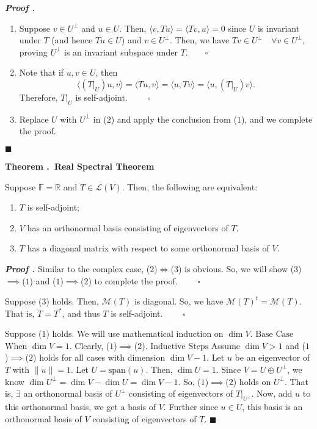\documentclass[11pt, letterpaper]{article}
\newcounter{index}[subsection]
\newenvironment*{thm}[1]{\begin{tcolorbox}\par\noindent\textbf{Theorem \thesubsection.\stepcounter{index}\theindex\ #1} \par}{\par\end{tcolorbox}}
\newcounter{nprf}[subsection]
\newenvironment*{prf}{\par\indent\textbf{\textit{Proof \stepcounter{nprf}\thenprf.}}}{\hfill$\blacksquare$\par}
\def\R{\mathbb{R}}
\def\F{\mathbb{F}}
\def\L{\mathcal{L}}
\def\M{\mathcal{M}}
\def\span{\mathrm{span}}
\def\pqde{\qquad\square}
\begin{document}
\begin{prf}
	\begin{enumerate}
		\item Suppose $v\in U^\perp$ and $u\in U$. Then, $\langle v,Tu\rangle=\langle Tv,u\rangle=0$ since $U$ is invariant under $T$ (and hence $Tu\in U$) and $v\in U^\perp$. Then, we have $Tv\in U^\perp\quad\forall v\in U^\perp$, proving $U^\perp$ is an invariant subspace under $T.\pqde$
		\item Note that if $u,v\in U$, then \[\langle(T|_U)u,v\rangle=\langle Tu,v\rangle=\langle u,Tv\rangle=\langle u,(T|_U)v\rangle.\] Therefore, $T|_U$ is self-adjoint. $\pqde$
		\item Replace $U$ with $U^\perp$ in ($2$) and apply the conclusion from ($1$), and we complete the proof.
	\end{enumerate}
\end{prf}
\begin{thm}{Real Spectral Theorem}
	Suppose $\F=\R$ and $T\in\L(V)$. Then, the following are equivalent: 
	\begin{enumerate}
		\item $T$ is self-adjoint;
		\item $V$ has an orthonormal basis consisting of eigenvectors of $T$.
		\item $T$ has a diagonal matrix with respect to some orthonormal basis of $V$.
	\end{enumerate}
\end{thm}
\begin{prf}
	Similar to the complex case, ($2$)$\iff$($3$) is obvious. So, we will show ($3$)$\implies$($1$) and ($1$)$\implies$($2$) to complete the proof. $\pqde$\par 
	Suppose ($3$) holds. Then, $\M(T)$ is diagonal. So, we have $\M(T)^t=\M(T)$. That is, $T=T^*$, and thus $T$ is self-adjoint. $\pqde$\par 
	Suppose ($1$) holds. We will use mathematical induction on $\dim V$. $\boxed{\text{Base Case}}$ When $\dim V=1$. Clearly, ($1$)$\implies$($2$). $\boxed{\text{Inductive Steps}}$ Assume $\dim V>1$ and ($1$)$\implies$($2$) holds for all cases with dimension $\dim V-1$. Let $u$ be an eigenvector of $T$ with $\|u\|=1$. Let $U=\span(u)$. Then, $\dim U=1$. Since $V=U\oplus U^\perp$, we know $\dim U^\perp=\dim V-\dim U=\dim V-1$. So, ($1$)$\implies$($2$) holds on $U^\perp$. That is, $\exists$ an orthonormal basis of $U^\perp$ consisting of eigenvectors of $T|_{U^\perp}$. Now, add $u$ to this orthonormal basis, we get a basis of $V$. Further since $u\in U$, this basis is an orthonormal basis of $V$ consisting of eigenvectors of $T$. 
\end{prf}
\end{document}
